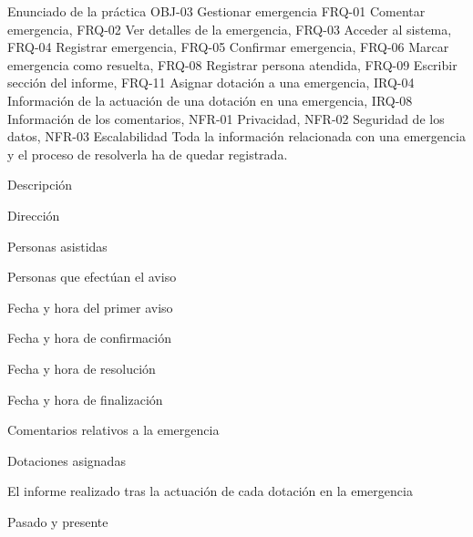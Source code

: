 {\reportauthors}
{Enunciado de la práctica}
{OBJ-03 Gestionar emergencia}
{FRQ-01 Comentar emergencia, FRQ-02 Ver detalles de la emergencia, FRQ-03 Acceder al sistema, FRQ-04 Registrar emergencia, FRQ-05 Confirmar emergencia, FRQ-06 Marcar emergencia como resuelta, FRQ-08 Registrar persona atendida, FRQ-09 Escribir sección del informe, FRQ-11 Asignar dotación a una emergencia, IRQ-04 Información de la actuación de una dotación en una emergencia, IRQ-08 Información de los comentarios, NFR-01 Privacidad, NFR-02 Seguridad de los datos, NFR-03 Escalabilidad}
{Toda la información relacionada con una emergencia y el proceso de resolverla ha de quedar registrada.}
{
\item{Descripción}
\item{Dirección}
\item{Personas asistidas}
\item{Personas que efectúan el aviso}
\item{Fecha y hora del primer aviso}
\item{Fecha y hora de confirmación}
\item{Fecha y hora de resolución}
\item{Fecha y hora de finalización}
\item{Comentarios relativos a la emergencia}
\item{Dotaciones asignadas}
\item{El informe realizado tras la actuación de cada dotación en la emergencia}
}
{Pasado y presente}

